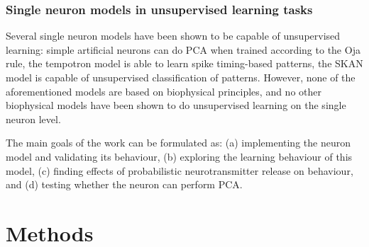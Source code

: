 \documentclass[a4paper,12pt]{report}
\theoremstyle{definition}
\begin{document}




\subsection{Single neuron models in unsupervised learning tasks}

Several single neuron models have been shown to be capable of unsupervised learning: simple artificial neurons can do PCA when trained according to the Oja rule, the tempotron model \cite{gutig2006tempotron} is able to learn spike timing-based patterns, the SKAN model \cite{afshar2014racing} is capable of unsupervised classification of patterns. However, none of the aforementioned models are based on biophysical principles, and no other biophysical models have been shown to do unsupervised learning on the single neuron level.


The main goals of the work can be formulated as:
(a) implementing the neuron model and validating its behaviour,
(b) exploring the learning behaviour of this model,
(c) finding effects of probabilistic neurotransmitter release on behaviour, and
(d) testing whether the neuron can perform PCA.




\chapter{Methods}
\end{document}
